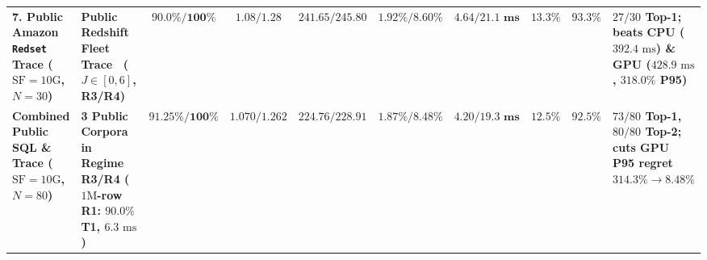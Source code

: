 \documentclass[10pt,a4paper]{article}
\newenvironment{fitasttable}{%
  \begin{lrbox}{\asttblbox}%
}{%
  \end{lrbox}%
  \sbox{\asttblboxB}{%
    \ifdim\wd\asttblbox>0.96\textwidth
      \resizebox{0.96\textwidth}{!}{\usebox{\asttblbox}}%
    \else
      \usebox{\asttblbox}%
    \fi
  }%
  \ifdim\ht\asttblboxB>0.72\textheight
    \resizebox{!}{0.72\textheight}{\usebox{\asttblboxB}}%
  \else
    \usebox{\asttblboxB}%
  \fi
}
\begin{document}
\begin{table}[!htbp]
\begin{fitasttable}
\begin{tabular}{@{}llcccccccl@{}}
\textbf{7. Public Amazon \texttt{Redset} Trace ($\text{SF}=10\text{G}$, $N=30$)} & \textbf{Public Redshift Fleet Trace~\cite{vanrenen2024redset} ($J\in[0,6]$, R3/R4)} & $\mathbf{90.0\% / 100\%}$ & $\mathbf{1.08 / 1.28}$ & $\mathbf{241.65 / 245.80}$ & $\mathbf{1.92\% / 8.60\%}$ & $\mathbf{4.64 / 21.1\text{ ms}}$ & $13.3\%$ & $\mathbf{93.3\%}$ & \textbf{$27/30$ Top-1; beats CPU ($392.4\text{ ms}$) \& GPU ($428.9\text{ ms}$, $318.0\%$ P95)} \\
\textbf{Combined Public SQL \& Trace ($\text{SF}=10\text{G}$, $N=80$)} & \textbf{3 Public Corpora in Regime R3/R4 ($1\text{M}$-row R1: $90.0\%$ T1, $6.3\text{ ms}$)} & $\mathbf{91.25\% / 100\%}$ & $\mathbf{1.070 / 1.262}$ & $\mathbf{224.76 / 228.91}$ & $\mathbf{1.87\% / 8.48\%}$ & $\mathbf{4.20 / 19.3\text{ ms}}$ & $\mathbf{12.5\%}$ & $\mathbf{92.5\%}$ & \textbf{$73/80$ Top-1, $80/80$ Top-2; cuts GPU P95 regret $314.3\%\rightarrow 8.48\%$} \\
\bottomrule
\end{tabular}
\end{fitasttable}%
\end{table}
\end{document}
